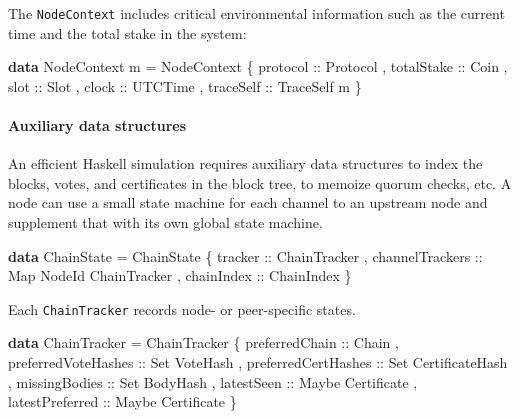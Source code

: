 \documentclass[10pt]{article}
\newenvironment{Shaded}{}{}
\newcommand{\DataTypeTok}[1]{\textcolor[rgb]{0.56,0.13,0.00}{#1}}
\newcommand{\KeywordTok}[1]{\textcolor[rgb]{0.00,0.44,0.13}{\textbf{#1}}}
\newcommand{\NormalTok}[1]{#1}
\newcommand{\OtherTok}[1]{\textcolor[rgb]{0.00,0.44,0.13}{#1}}
\begin{document}
The \texttt{NodeContext} includes critical environmental information
such as the current time and the total stake in the system:

\begin{Shaded}
\begin{Highlighting}[]
\KeywordTok{data} \DataTypeTok{NodeContext}\NormalTok{ m }\OtherTok{=} \DataTypeTok{NodeContext}
\NormalTok{  \{}\OtherTok{ protocol ::} \DataTypeTok{Protocol}
\NormalTok{  ,}\OtherTok{ totalStake ::} \DataTypeTok{Coin}
\NormalTok{  ,}\OtherTok{ slot ::} \DataTypeTok{Slot}
\NormalTok{  ,}\OtherTok{ clock ::} \DataTypeTok{UTCTime}
\NormalTok{  ,}\OtherTok{ traceSelf ::} \DataTypeTok{TraceSelf}\NormalTok{ m}
\NormalTok{  \}}
\end{Highlighting}
\end{Shaded}

\paragraph{Auxiliary data structures}\label{auxiliary-data-structures}

An efficient Haskell simulation requires auxiliary data structures to
index the blocks, votes, and certificates in the block tree, to memoize
quorum checks, etc. A node can use a small state machine for each
channel to an upstream node and supplement that with its own global
state machine.

\begin{Shaded}
\begin{Highlighting}[]
\KeywordTok{data} \DataTypeTok{ChainState} \OtherTok{=} \DataTypeTok{ChainState}
\NormalTok{  \{}\OtherTok{ tracker ::} \DataTypeTok{ChainTracker}
\NormalTok{  ,}\OtherTok{ channelTrackers ::} \DataTypeTok{Map} \DataTypeTok{NodeId} \DataTypeTok{ChainTracker}
\NormalTok{  ,}\OtherTok{ chainIndex ::} \DataTypeTok{ChainIndex}
\NormalTok{  \}}
\end{Highlighting}
\end{Shaded}

Each \texttt{ChainTracker} records node- or peer-specific states.

\begin{Shaded}
\begin{Highlighting}[]
\KeywordTok{data} \DataTypeTok{ChainTracker} \OtherTok{=} \DataTypeTok{ChainTracker}
\NormalTok{  \{}\OtherTok{ preferredChain ::} \DataTypeTok{Chain}
\NormalTok{  ,}\OtherTok{ preferredVoteHashes ::} \DataTypeTok{Set} \DataTypeTok{VoteHash}
\NormalTok{  ,}\OtherTok{ preferredCertHashes ::} \DataTypeTok{Set} \DataTypeTok{CertificateHash}
\NormalTok{  ,}\OtherTok{ missingBodies ::} \DataTypeTok{Set} \DataTypeTok{BodyHash}
\NormalTok{  ,}\OtherTok{ latestSeen ::} \DataTypeTok{Maybe} \DataTypeTok{Certificate}
\NormalTok{  ,}\OtherTok{ latestPreferred ::} \DataTypeTok{Maybe} \DataTypeTok{Certificate}
\NormalTok{  \}}
\end{Highlighting}
\end{Shaded}
\end{document}
